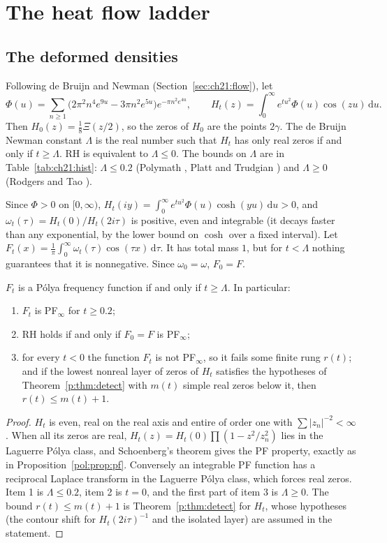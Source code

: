\section{The heat flow ladder}\label{p:sec:heat}

\subsection{The deformed densities}

Following de Bruijn and Newman (Section~\ref{sec:ch21:flow}), let
\[
\Phi(u)=\sum_{n\ge1}\big(2\pi^2n^4e^{9u}-3\pi n^2e^{5u}\big)e^{-\pi n^2e^{4u}},\qquad
H_t(z)=\int_0^\infty e^{tu^2}\Phi(u)\cos(zu)\,\mathrm du .
\]
Then $H_0(z)=\frac18\Xi(z/2)$, so the zeros of $H_0$ are the points $2\gamma$. The de Bruijn Newman constant $\Lambda$ is the real number such that $H_t$ has only real zeros if and only if $t\ge\Lambda$. RH is equivalent to $\Lambda\le0$. The bounds on $\Lambda$ are in Table~\ref{tab:ch21:hist}: $\Lambda\le0.2$ (Polymath \cite{Polymath}, Platt and Trudgian \cite{PT21}) and $\Lambda\ge0$ (Rodgers and Tao \cite{RodgersTao}).

Since $\Phi>0$ on $[0,\infty)$, $H_t(iy)=\int_0^\infty e^{tu^2}\Phi(u)\cosh(yu)\,\mathrm du>0$, and $\omega_t(\tau)=H_t(0)/H_t(2i\tau)$ is positive, even and integrable (it decays faster than any exponential, by the lower bound on $\cosh$ over a fixed interval). Let $F_t(x)=\frac1\pi\int_0^\infty\omega_t(\tau)\cos(\tau x)\,\mathrm d\tau$. It has total mass $1$, but for $t<\Lambda$ nothing guarantees that it is nonnegative. Since $\omega_0=\omega$, $F_0=F$.

\begin{theorem}\label{p:thm:heat}
$F_t$ is a P\'olya frequency function if and only if $t\ge\Lambda$. In particular:
\begin{enumerate}
\item $F_t$ is PF$_\infty$ for $t\ge0.2$;
\item RH holds if and only if $F_0=F$ is PF$_\infty$;
\item for every $t<0$ the function $F_t$ is not PF$_\infty$, so it fails some finite rung $r(t)$; and if the lowest nonreal layer of zeros of $H_t$ satisfies the hypotheses of Theorem~\ref{p:thm:detect} with $m(t)$ simple real zeros below it, then $r(t)\le m(t)+1$.
\end{enumerate}
\end{theorem}

\begin{proof}
$H_t$ is even, real on the real axis and entire of order one with $\sum|z_n|^{-2}<\infty$. When all its zeros are real, $H_t(z)=H_t(0)\prod(1-z^2/z_n^2)$ lies in the Laguerre P\'olya class, and Schoenberg's theorem gives the PF property, exactly as in Proposition~\ref{pol:prop:pf}. Conversely an integrable PF function has a reciprocal Laplace transform in the Laguerre P\'olya class, which forces real zeros. Item 1 is $\Lambda\le0.2$, item 2 is $t=0$, and the first part of item 3 is $\Lambda\ge0$. The bound $r(t)\le m(t)+1$ is Theorem~\ref{p:thm:detect} for $H_t$, whose hypotheses (the contour shift for $H_t(2i\tau)^{-1}$ and the isolated layer) are assumed in the statement.
\end{proof}


